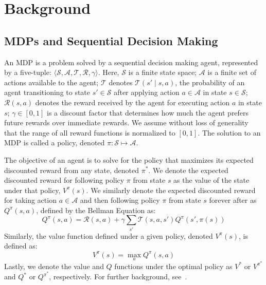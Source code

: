 
\section{Background}


\subsection{\acp{MDP} and Sequential Decision Making}
An \ac{MDP} is a problem solved by a sequential decision making agent, represented by a five-tuple: $\langle \mathcal{S}, \mathcal{A}, \mathcal{T}, \mathcal{R}, \gamma \rangle$. Here, $\mathcal{S}$ is a finite state space; $\mathcal{A}$ is a finite set of actions available to the agent; $\mathcal{T}$ denotes $\mathcal{T}(s' \mid s,a)$, the probability of an agent transitioning to state $s' \in \mathcal{S}$ after applying action $a \in \mathcal{A}$ in state $s \in \mathcal{S}$; $\mathcal{R}(s,a)$ denotes the reward received by the agent for executing action $a$ in state $s$; $\gamma \in [0, 1]$ is a discount factor that determines how much the agent prefers future rewards over immediate rewards. We assume without loss of generality that the range of all reward functions is normalized to $[0,1]$. The solution to an \ac{MDP} is called a policy, denoted $\pi: \mathcal{S} \mapsto \mathcal{A}$.

The objective of an agent is to solve for the policy that maximizes its expected discounted reward from any state, denoted $\pi^*$. We denote the expected discounted reward for following policy $\pi$ from state $s$ as the value of the state under that policy, $V^\pi(s)$. We similarly denote the expected discounted reward for taking action $a \in \mathcal{A}$ and then following policy $\pi$ from state $s$ forever after as $Q^\pi(s,a)$, defined by the Bellman Equation as:
\begin{equation}
Q^\pi(s,a) = \mathcal{R}(s,a) + \gamma \sum_{s'} \mathcal{T}(s,a,s') Q^\pi(s',\pi(s))
\end{equation}
Similarly, the value function defined under a given policy, denoted $V^\pi(s)$, is defined as:
\begin{equation}
V^\pi(s) = \max_a Q^\pi(s,a)
\end{equation}
Lastly, we denote the value and $Q$ functions under the optimal policy as $V^*$ or $V^{\pi^*}$ and $Q^*$ or $Q^{\pi^*}$, respectively. For further background, see~\cite{kaelbling1996reinforcement}.

